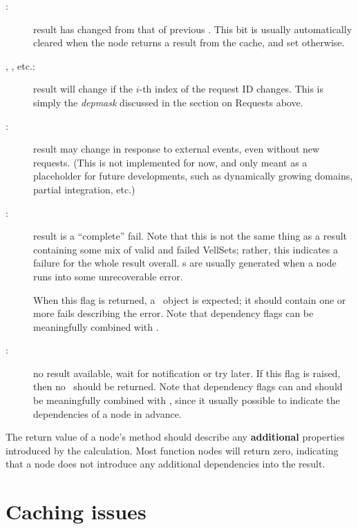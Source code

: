   \begin{description}
  
  \item[:] result has changed from that of previous \Request. This
    bit is usually automatically cleared when the node returns a result 
    from the cache, and set otherwise.
     
  \item[, , etc.:] result will change if the $i$-th
    index of the request ID changes. This is simply the {\em depmask\/} discussed
    in the section on Requests above.

  \item[:] result may change in response to external events,
    even without new requests. (This is not implemented for now, and only meant
    as a placeholder for future developments, such as dynamically growing
    domains, partial integration, etc.)

  \item[:] result is a ``complete'' fail. Note that this is not the
    same thing as a result containing some mix of valid and failed VellSets;
    rather, this indicates a failure for the whole result overall. s
    are usually generated when a node runs into some unrecoverable error.
    
    When this flag is returned, a \Result\ object is expected; it should
    contain one or more fails describing the error. Note that dependency flags
    can be meaningfully combined with .

  \item[:] no result available, wait for notification or try later.
    If this flag is raised, then no \Result\ should be returned. Note that
    dependency flags can and should be meaningfully combined with ,
    since it usually possible to indicate the dependencies of a node in
    advance.

  \end{description}
  
  The return value of a node's  method should describe any {\bf
  additional} properties introduced by the  calculation.
  Most function nodes will
  return zero, indicating that a node does not introduce any additional
  dependencies into the result. 
  
\section{Caching issues}


